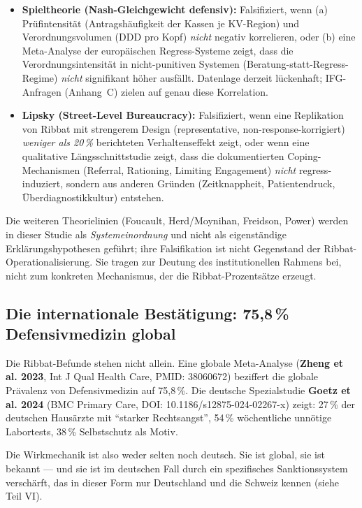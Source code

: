 \documentclass{umbruch-position}
\begin{document}
\begin{itemize}[nosep]
  \item \textbf{Spieltheorie (Nash-Gleichgewicht defensiv):} Falsifiziert, wenn (a) Prüfintensität (Antragshäufigkeit der Kassen je KV-Region) und Verordnungsvolumen (DDD pro Kopf) \textit{nicht} negativ korrelieren, oder (b) eine Meta-Analyse der europäischen Regress-Systeme zeigt, dass die Verordnungs\-intensität in nicht-punitiven Systemen (Beratung-statt-Regress-Regime) \textit{nicht} signifikant höher ausfällt. Datenlage derzeit lückenhaft; IFG-Anfragen (Anhang~C) zielen auf genau diese Korrelation.
  \item \textbf{Lipsky (Street-Level Bureaucracy):} Falsifiziert, wenn eine Replikation von Ribbat mit strengerem Design (representative, non-response-korrigiert) \textit{weniger als 20\,\%} berichteten Verhaltenseffekt zeigt, oder wenn eine qualitative Längsschnitt\-studie zeigt, dass die dokumentierten Coping-Mechanismen (Referral, Rationing, Limiting Engagement) \textit{nicht} regress-induziert, sondern aus anderen Gründen (Zeit\-knappheit, Patienten\-druck, Über\-diagnostik\-kultur) entstehen.
\end{itemize}

Die weiteren Theorielinien (Foucault, Herd/Moynihan, Freidson, Power) werden in dieser Studie als \emph{System\-einordnung} und nicht als eigenständige Erklärungshypothesen geführt; ihre Falsifikation ist nicht Gegenstand der Ribbat-Operationalisierung. Sie tragen zur Deutung des institutionellen Rahmens bei, nicht zum konkreten Mechanismus, der die Ribbat-Prozentsätze erzeugt.

\subsection{Die internationale Bestätigung: 75,8\,\% Defensivmedizin global}

Die Ribbat-Befunde stehen nicht allein. Eine globale Meta-Analyse (\textbf{Zheng et al. 2023}, Int J Qual Health Care, PMID: 38060672) beziffert die globale Prävalenz von Defensivmedizin auf 75,8\,\%. Die deutsche Spezialstudie \textbf{Goetz et al. 2024} (BMC Primary Care, DOI: 10.1186/s12875-024-02267-x) zeigt: 27\,\% der deutschen Hausärzte mit ``starker Rechtsangst'', 54\,\% wöchentliche unnötige Labortests, 38\,\% Selbstschutz als Motiv.

Die Wirkmechanik ist also weder selten noch deutsch. Sie ist global, sie ist bekannt --- und sie ist im deutschen Fall durch ein spezifisches Sanktionssystem verschärft, das in dieser Form nur Deutschland und die Schweiz kennen (siehe Teil VI).
\end{document}
